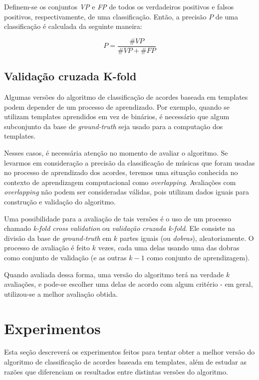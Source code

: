         Definem-se os conjuntos \textit{VP} e \textit{FP} de todos os verdadeiros positivos e falsos positivos, respectivamente, de uma classificação. Então, a precisão $P$ de uma classificação é calculada da seguinte maneira:
        
        \[
            P = \frac{\#VP}{\#VP + \#FP}
        \]
    
    \subsection{Validação cruzada K-fold}
        Algumas versões do algoritmo de classificação de acordes baseada em templates podem depender de um processo de aprendizado. Por exemplo, quando se utilizam templates aprendidos em vez de binários, é necessário que algum subconjunto da base de \textit{ground-truth} seja usado para a computação dos templates.
        
        Nesses casos, é necessária atenção no momento de avaliar o algoritmo. Se levarmos em consideração a precisão da classificação de músicas que foram usadas no processo de aprendizado dos acordes, teremos uma situação conhecida no contexto de aprendizagem computacional como \textit{overlapping}. Avaliações com \textit{overlapping} não podem ser consideradas válidas, pois utilizam dados iguais para construção e validação do algoritmo.
        
        Uma possibilidade para a avaliação de tais versões é o uso de um processo chamado \textit{k-fold cross validation} ou \textit{validação cruzada k-fold}. Ele consiste na divisão da base de \textit{ground-truth} em $k$ partes iguais (ou \textit{dobras}), aleatoriamente. O processo de avaliação é feito $k$ vezes, cada uma delas usando uma das dobras como conjunto de validação (e as outras $k - 1$ como conjunto de aprendizagem).
        
        Quando avaliada dessa forma, uma versão do algoritmo terá na verdade $k$ avaliações, e pode-se escolher uma delas de acordo com algum critério - em geral, utilizou-se a melhor avaliação obtida. 


\section{Experimentos}
    Esta seção descreverá os experimentos feitos para tentar obter a melhor versão do algoritmo de classificação de acordes baseada em templates, além de estudar as razões que diferenciam os resultados entre distintas versões do algoritmo.
    
